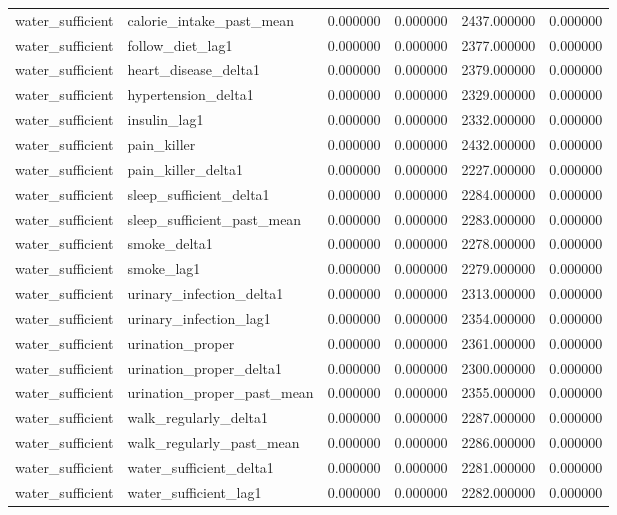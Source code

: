 \begin{longtable}{llrrrr}
water\_sufficient & calorie\_intake\_past\_mean & 0.000000 & 0.000000 & 2437.000000 & 0.000000 \\
water\_sufficient & follow\_diet\_lag1 & 0.000000 & 0.000000 & 2377.000000 & 0.000000 \\
water\_sufficient & heart\_disease\_delta1 & 0.000000 & 0.000000 & 2379.000000 & 0.000000 \\
water\_sufficient & hypertension\_delta1 & 0.000000 & 0.000000 & 2329.000000 & 0.000000 \\
water\_sufficient & insulin\_lag1 & 0.000000 & 0.000000 & 2332.000000 & 0.000000 \\
water\_sufficient & pain\_killer & 0.000000 & 0.000000 & 2432.000000 & 0.000000 \\
water\_sufficient & pain\_killer\_delta1 & 0.000000 & 0.000000 & 2227.000000 & 0.000000 \\
water\_sufficient & sleep\_sufficient\_delta1 & 0.000000 & 0.000000 & 2284.000000 & 0.000000 \\
water\_sufficient & sleep\_sufficient\_past\_mean & 0.000000 & 0.000000 & 2283.000000 & 0.000000 \\
water\_sufficient & smoke\_delta1 & 0.000000 & 0.000000 & 2278.000000 & 0.000000 \\
water\_sufficient & smoke\_lag1 & 0.000000 & 0.000000 & 2279.000000 & 0.000000 \\
water\_sufficient & urinary\_infection\_delta1 & 0.000000 & 0.000000 & 2313.000000 & 0.000000 \\
water\_sufficient & urinary\_infection\_lag1 & 0.000000 & 0.000000 & 2354.000000 & 0.000000 \\
water\_sufficient & urination\_proper & 0.000000 & 0.000000 & 2361.000000 & 0.000000 \\
water\_sufficient & urination\_proper\_delta1 & 0.000000 & 0.000000 & 2300.000000 & 0.000000 \\
water\_sufficient & urination\_proper\_past\_mean & 0.000000 & 0.000000 & 2355.000000 & 0.000000 \\
water\_sufficient & walk\_regularly\_delta1 & 0.000000 & 0.000000 & 2287.000000 & 0.000000 \\
water\_sufficient & walk\_regularly\_past\_mean & 0.000000 & 0.000000 & 2286.000000 & 0.000000 \\
water\_sufficient & water\_sufficient\_delta1 & 0.000000 & 0.000000 & 2281.000000 & 0.000000 \\
water\_sufficient & water\_sufficient\_lag1 & 0.000000 & 0.000000 & 2282.000000 & 0.000000 \\

\end{longtable}
